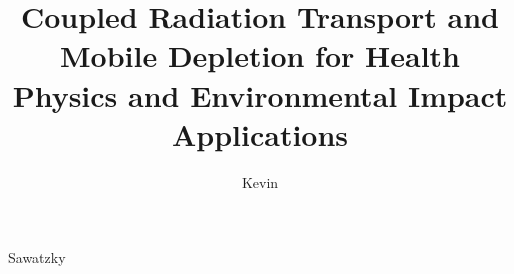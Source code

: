 \documentclass{dissertation}
\theoremstyle{definition}
\theoremstyle{remark}
\begin{document}

\title{Coupled Radiation Transport and Mobile Depletion for Health Physics and Environmental Impact Applications} 
\author{Kevin}{Sawatzky}

\frontmatter

\doublespacing

\setcounter{page}{2}





\tableofcontents
\listoffigures
\listoftables
{}
\lstlistoflistings


\doublespacing
% 
% 

\mainmatter












\appendix

\thumbfalse

% 

\end{document}

